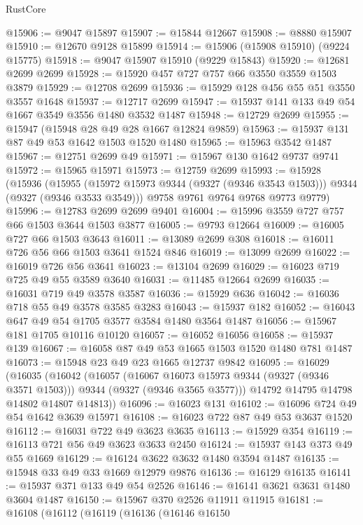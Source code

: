 \begin{lexlean}{RustCore}
\begin{coremodule}
@15906 := @9047 @15897
@15907 := @15844 @12667
@15908 := @8880 @15907
@15910 := @12670 @9128 @15899
@15914 := @15906 (@15908 @15910) (@9224 @15775)
@15918 := @9047 @15907 @15910 (@9229 @15843)
@15920 := @12681 @2699 @2699
@15928 := @15920 @457 @727 @757 @66 @3550 @3559 @1503 @3879
@15929 := @12708 @2699
@15936 := @15929 @128 @456 @55 @51 @3550 @3557 @1648
@15937 := @12717 @2699
@15947 := @15937 @141 @133 @49 @54 @1667 @3549 @3556 @1480 @3532 @1487
@15948 := @12729 @2699
@15955 := @15947 (@15948 @28 @49 @28 @1667 @12824 @9859)
@15963 := @15937 @131 @87 @49 @53 @1642 @1503 @1520 @1480
@15965 := @15963 @3542 @1487
@15967 := @12751 @2699 @49
@15971 := @15967 @130 @1642 @9737 @9741
@15972 := @15965 @15971
@15973 := @12759 @2699
@15993 := @15928
    (@15936
      (@15955 (@15972 @15973 @9344 (@9327 (@9346 @3543 @1503))) @9344 (@9327 (@9346 @3533 @3549)))
      @9758
      @9761
      @9764
      @9768
      @9773
      @9779)
@15996 := @12783 @2699 @2699 @9401
@16004 := @15996 @3559 @727 @757 @66 @1503 @3644 @1503 @3877
@16005 := @9793 @12664
@16009 := @16005 @727 @66 @1503 @3643
@16011 := @13089 @2699 @308
@16018 := @16011 @726 @56 @66 @1503 @3641 @1524 @846
@16019 := @13099 @2699
@16022 := @16019 @726 @56 @3641
@16023 := @13104 @2699
@16029 := @16023 @719 @725 @49 @55 @3589 @3640
@16031 := @11485 @12664 @2699
@16035 := @16031 @719 @49 @3578 @3587
@16036 := @15929 @636
@16042 := @16036 @718 @55 @49 @3578 @3585 @3283
@16043 := @15937 @182
@16052 := @16043 @647 @49 @54 @1705 @3577 @3584 @1480 @3564 @1487
@16056 := @15967 @181 @1705 @10116 @10120
@16057 := @16052 @16056
@16058 := @15937 @139
@16067 := @16058 @87 @49 @53 @1665 @1503 @1520 @1480 @781 @1487
@16073 := @15948 @23 @49 @23 @1665 @12737 @9842
@16095 := @16029
    (@16035
      (@16042
        (@16057
          (@16067 @16073 @15973 @9344 (@9327 (@9346 @3571 @1503)))
          @9344
          (@9327 (@9346 @3565 @3577)))
        @14792
        @14795
        @14798
        @14802
        @14807
        @14813))
@16096 := @16023 @131
@16102 := @16096 @724 @49 @54 @1642 @3639 @15971
@16108 := @16023 @722 @87 @49 @53 @3637 @1520
@16112 := @16031 @722 @49 @3623 @3635
@16113 := @15929 @354
@16119 := @16113 @721 @56 @49 @3623 @3633 @2450
@16124 := @15937 @143 @373 @49 @55 @1669
@16129 := @16124 @3622 @3632 @1480 @3594 @1487
@16135 := @15948 @33 @49 @33 @1669 @12979 @9876
@16136 := @16129 @16135
@16141 := @15937 @371 @133 @49 @54 @2526
@16146 := @16141 @3621 @3631 @1480 @3604 @1487
@16150 := @15967 @370 @2526 @11911 @11915
@16181 := @16108
    (@16112
      (@16119
        (@16136
          (@16146
            @16150

\end{coremodule}
\end{lexlean}
